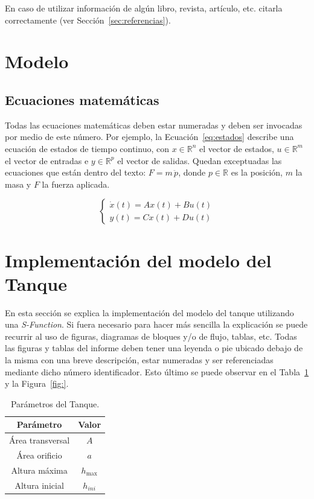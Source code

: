 \documentclass[10pt]{article}
\begin{document}
En caso de utilizar información de algún libro, revista, artículo, etc. 
citarla correctamente (ver Sección~\ref{sec:referencias}).


\section{Modelo}
\subsection{Ecuaciones matemáticas}
Todas las ecuaciones matemáticas deben estar numeradas y deben ser invocadas por medio de este número. Por ejemplo, la Ecuación~\eqref{eq:estados} describe una ecuación de estados de tiempo continuo, con $x \in \mathbb{R}^{n}$ el vector de estados, $u \in \mathbb{R}^{m}$ el vector de entradas e $y \in \mathbb{R}^{p}$ el vector de salidas. Quedan exceptuadas las ecuaciones que están dentro del texto: $F = m\,\ddot{p}$, donde $p \in \mathbb{R}$ es la posición, $m$ la masa y $F$ la fuerza aplicada. 

\begin{equation}
\left\{\begin{array}{l}
\dot{x}(t) = A x(t) + B u(t)\\
y(t) = C x(t) + D u(t)
\end{array}\right.
\label{eq:estados}
\end{equation}


\section{Implementación del modelo del Tanque}
\label{sec:impltanque}
En esta sección se explica la implementación del modelo del tanque utilizando una \textit{S-Function}. Si fuera necesario para hacer más sencilla la explicación se puede recurrir al uso de figuras, diagramas de bloques y/o de flujo, tablas, etc. Todas las figuras y tablas del informe deben tener una leyenda o pie ubicado debajo de la misma con una breve descripción, estar numeradas y ser referenciadas mediante dicho número identificador. Esto último se puede observar en el Tabla~\ref{tab:paramstanque} y la Figura~\ref{fig:}.

\begin{table}[t]
\begin{center}
\begin{tabular}{cc}
\toprule
\textbf{Parámetro} & \textbf{Valor}\\
\midrule
Área transversal & $A$\\
Área orificio & $a$\\
Altura máxima & $h_{\max}$\\
Altura inicial & $h_{ini}$\\
\bottomrule
\end{tabular}
\end{center}
\caption{Parámetros del Tanque.}
\label{tab:paramstanque}
\end{table}
\end{document}
